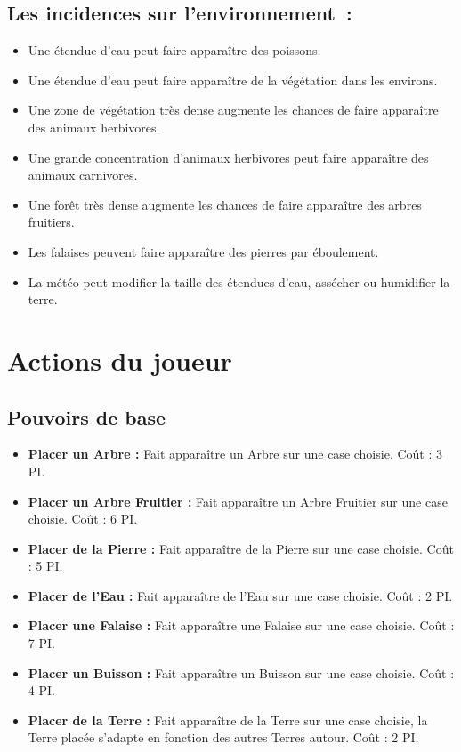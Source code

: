 \documentclass[a4paper]{article}
\begin{document}
\subsection*{Les incidences sur l'environnement :}
  \begin{itemize} \small
    \item Une étendue d'eau peut faire apparaître des poissons.
    \item Une étendue d'eau peut faire apparaître de la végétation dans les environs.
    \item Une zone de végétation très dense augmente les chances de faire apparaître des animaux herbivores.
    \item Une grande concentration d'animaux herbivores peut faire apparaître des animaux carnivores.
    \item Une forêt très dense augmente les chances de faire apparaître des arbres fruitiers.
    \item Les falaises peuvent faire apparaître des pierres par éboulement.
    \item La météo peut modifier la taille des étendues d'eau, assécher ou humidifier la terre.
  \end{itemize} \normalsize

\section*{Actions du joueur}

\subsection*{Pouvoirs de base}
\begin{itemize}
  \item \textbf{Placer un Arbre :} \small{ Fait apparaître un Arbre sur une case choisie. Coût : 3 PI.}
  \item \textbf{Placer un Arbre Fruitier :} \small{ Fait apparaître un Arbre Fruitier sur une case choisie. Coût : 6 PI.}
  \item \textbf{Placer de la Pierre :} \small{ Fait apparaître de la Pierre sur une case choisie. Coût : 5 PI.}
  \item \textbf{Placer de l'Eau :} \small{ Fait apparaître de l'Eau sur une case choisie. Coût : 2 PI.}
  \item \textbf{Placer une Falaise :} \small{ Fait apparaître une Falaise sur une case choisie. Coût : 7 PI.}
  \item \textbf{Placer un Buisson :} \small{ Fait apparaître un Buisson sur une case choisie. Coût : 4 PI.}
  \item \textbf{Placer de la Terre :} \small{ Fait apparaître de la Terre sur une case choisie, la Terre placée s'adapte en fonction des autres Terres autour. Coût : 2 PI.}
\end{itemize}
\end{document}

